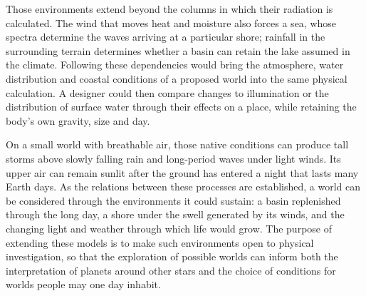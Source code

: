 Those environments extend beyond the columns in which their radiation is calculated. The wind that moves
heat and moisture also forces a sea, whose spectra determine the waves arriving at a particular shore;
rainfall in the surrounding terrain determines whether a basin can retain the lake assumed in the climate.
Following these dependencies would bring the atmosphere, water distribution and coastal conditions of a
proposed world into the same physical calculation. A designer could then compare changes to illumination
or the distribution of surface water through their effects on a place, while retaining the body's own
gravity, size and day.

On a small world with breathable air, those native conditions can produce tall storms above slowly falling
rain and long-period waves under light winds. Its upper air can remain sunlit after the ground has entered
a night that lasts many Earth days. As the relations between these processes are established, a world can
be considered through the environments it could sustain: a basin replenished through the long day, a shore
under the swell generated by its winds, and the changing light and weather through which life would grow.
The purpose of extending these models is to make such environments open to physical investigation, so that
the exploration of possible worlds can inform both the interpretation of planets around other stars and
the choice of conditions for worlds people may one day inhabit.
